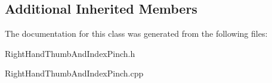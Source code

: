 \subsection*{Additional Inherited Members}


The documentation for this class was generated from the following files\+:\begin{DoxyCompactItemize}
\item 
Right\+Hand\+Thumb\+And\+Index\+Pinch.\+h\item 
Right\+Hand\+Thumb\+And\+Index\+Pinch.\+cpp\end{DoxyCompactItemize}
